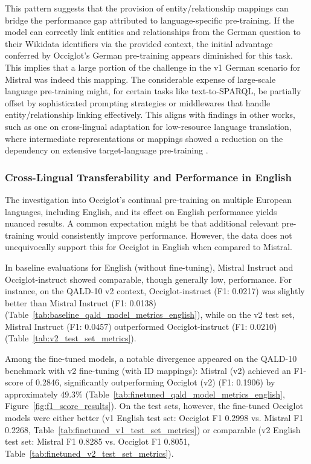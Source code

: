 This pattern suggests that the provision of entity/relationship mappings can bridge the performance gap attributed to language-specific pre-training. 
If the model can correctly link entities and relationships from the German question to their Wikidata identifiers via the provided context, the initial advantage conferred by Occiglot's German pre-training appears diminished for this task.
This implies that a large portion of the challenge in the v1 German scenario for Mistral was indeed this mapping. 
The considerable expense of large-scale language pre-training might, for certain tasks like text-to-SPARQL, be partially offset by sophisticated prompting strategies or middlewares that handle entity/relationship linking effectively.
This aligns with findings in other works, such as one on cross-lingual adaptation for low-resource language translation, where intermediate representations or mappings showed a reduction on the dependency on extensive target-language pre-training \cite{singh2024threeprongedapproachcrosslingualadaptation}.

\subsubsection{Cross-Lingual Transferability and Performance in English}

The investigation into Occiglot's continual pre-training on multiple European languages, including English, and its effect on English performance yields nuanced results. 
A common expectation might be that additional relevant pre-training would consistently improve performance. 
However, the data does not unequivocally support this for Occiglot in English when compared to Mistral.

In baseline evaluations for English (without fine-tuning), Mistral Instruct and Occiglot-instruct showed comparable, though generally low, performance. 
For instance, on the QALD-10 v2 context, Occiglot-instruct (F1: 0.0217) was slightly better than Mistral Instruct (F1: 0.0138) (Table~\ref{tab:baseline_qald_model_metrics_english}), while on the v2 test set, Mistral Instruct (F1: 0.0457) outperformed Occiglot-instruct (F1: 0.0210) (Table~\ref{tab:v2_test_set_metrics}).

Among the fine-tuned models, a notable divergence appeared on the QALD-10 benchmark with v2 fine-tuning (with ID mappings): Mistral (v2) achieved an F1-score of 0.2846, significantly outperforming Occiglot (v2) (F1: 0.1906) by approximately 49.3\% (Table~\ref{tab:finetuned_qald_model_metrics_english}, Figure~\ref{fig:f1_score_results}). 
On the test sets, however, the fine-tuned Occiglot models were either better (v1 English test set: Occiglot F1 0.2998 vs. Mistral F1 0.2268, Table~\ref{tab:finetuned_v1_test_set_metrics}) or comparable (v2 English test set: Mistral F1 0.8285 vs. Occiglot F1 0.8051, Table~\ref{tab:finetuned_v2_test_set_metrics}).

